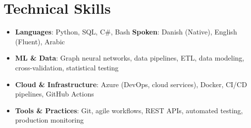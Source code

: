 \documentclass[letterpaper,11pt]{article}
\newcommand{\resumeSubHeadingListStart}{\begin{itemize}[leftmargin=*]}
\newcommand{\resumeSubHeadingListEnd}{\end{itemize}}
\begin{document}
\section{Technical Skills}
 \resumeSubHeadingListStart
   \item{
     \textbf{Languages}{: Python, SQL, C\#, Bash \hfill \textbf{Spoken}: Danish (Native), English (Fluent), Arabic}
   }
   \item{
     \textbf{ML \& Data}{: Graph neural networks, data pipelines, ETL, data modeling, cross-validation, statistical testing}
   }
   \item{
     \textbf{Cloud \& Infrastructure}{: Azure (DevOps, cloud services), Docker, CI/CD pipelines, GitHub Actions}
   }
   \item{
     \textbf{Tools \& Practices}{: Git, agile workflows, REST APIs, automated testing, production monitoring}
   }
 \resumeSubHeadingListEnd


\end{document}
